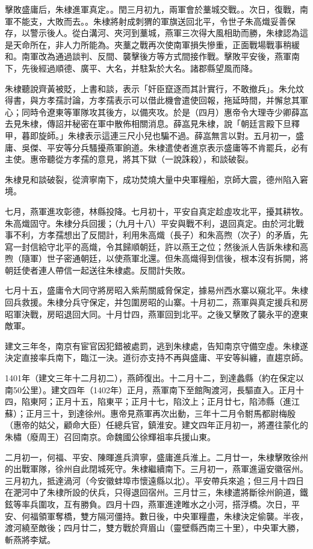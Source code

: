 擊敗盛庸后，朱棣進軍真定。。閏三月初九，兩軍會於藳城交戰。。次日，復戰，南軍不能支，大敗而去。。朱棣將射成刺猬的軍旗送回北平，令世子朱高熾妥善保存，以警示後人。從白溝河、夾河到藳城，燕軍三次得大風相助而勝，朱棣認為這是天命所在，非人力所能為。夾藳之戰再次使南軍損失慘重，正面戰場戰事稍緩和。南軍改為通過談判、反間、襲擊後方等方式間接作戰。擊敗平安後，燕軍南下，先後經過順德、廣平、大名，并駐紮於大名。諸郡縣望風而降。

朱棣聽說齊黃被貶，上書和談，表示「奸臣竄逐而其計實行，不敢撤兵」。朱允炆得書，與方孝孺討論，方孝孺表示可以借此機會遣使回報，拖延時間，并懈怠其軍心；同時令遼東等軍隊攻其後方，以備夾攻。於是（四月）惠帝令大理寺少卿薛嵓去見朱棣，傳詔并秘密在軍中散佈相關消息。薛嵓見朱棣，說「朝廷言殿下旦釋甲，暮即旋師。」朱棣表示這連三尺小兒也騙不過。薛嵓無言以對。五月初一，盛庸、吳傑、平安等分兵騷擾燕軍餉道。朱棣遣使者進京表示盛庸等不肯罷兵，必有主使。惠帝聽從方孝孺的意見，將其下獄（一說誅殺），和談破裂。

朱棣見和談破裂，從濟寧南下，成功焚燒大量中央軍糧船，京師大震，德州陷入窘境。

七月，燕軍進攻彰德，林縣投降。七月初十，平安自真定趁虛攻北平，擾其耕牧。朱高熾固守。朱棣分兵回援；（九月十八）平安與戰不利，退回真定。由於河北戰事不利，方孝孺想出了反間計，利用朱高熾（長子）和朱高煦（次子）的矛盾，先寫一封信給守北平的高熾，令其歸順朝廷，許以燕王之位；然後派人告訴朱棣和高煦（隨軍）世子密通朝廷，以使燕軍北還。但朱高熾得到信後，根本沒有拆開，將朝廷使者連人帶信一起送往朱棣處。反間計失敗。

七月十五，盛庸令大同守將房昭入紫荊關威脅保定，據易州西水寨以窺北平。朱棣回兵救援。朱棣分兵守保定，并包圍房昭的山寨。十月初二，燕軍與真定援兵和房昭軍決戰，房昭退回大同。十月廿四，燕軍回到北平。之後又擊敗了襲永平的遼東敵軍。

建文三年冬，南京有宦官因犯錯被處罰，逃到朱棣處，告知南京守備空虛。朱棣遂決定直接率兵南下，臨江一決。道衍亦支持不再與盛庸、平安等糾纏，直趨京師。

1401年（建文三年十二月初二），燕師復出。十二月十二，到達蠡縣（約在保定以南50公里）。建文四年（1402年）正月，燕軍南下至館陶渡河，長驅直入。正月十四，陷東阿；正月十五，陷東平；正月十七，陷汶上；正月廿七，陷沛縣（進江蘇）；正月三十，到達徐州。惠帝見燕軍再次出動，三年十二月令駙馬都尉梅殷（惠帝的姑父，顧命大臣）任總兵官，鎮淮安。建文四年正月初一，將遷往蒙化的朱橚（廢周王）召回南京。命魏國公徐輝祖率兵援山東。

二月初一，何福、平安、陳暉進兵濟寧，盛庸進兵淮上。二月廿一，朱棣擊敗徐州的出戰軍隊，徐州自此閉城死守。朱棣繼續南下。三月初一，燕軍進逼安徽宿州。三月初九，抵達渦河（今安徽蚌埠市懷遠縣以北）。平安帶兵來追；但三月十四日在淝河中了朱棣所設的伏兵，只得退回宿州。三月廿三，朱棣遣將斷徐州餉道，鐵鉉等率兵圍攻，互有勝負。四月十四，燕軍進達睢水之小河，搭浮橋。次日，平安、何福領軍奪橋，雙方隔河僵持。數日後，中央軍糧盡，朱棣決定偷襲。半夜，渡河繞至敵後；四月廿二，雙方戰於齊眉山（靈壁縣西南三十里），中央軍大勝，斬燕將李斌。

